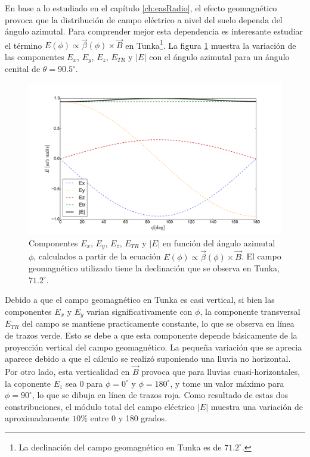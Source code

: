 	En base a lo estudiado en el cap\'itulo \ref{ch:easRadio}, el efecto geomagn\'etico provoca que la distribuci\'on de campo el\'ectrico a nivel del suelo dependa del \'angulo azimutal.
	Para comprender mejor esta dependencia es interesante estudiar el t\'ermino $E(\phi)\propto\vec\beta(\phi)\times \vec B$ en Tunka\footnote{La declinaci\'on del campo geomagn\'etico en Tunka es de $71.2^\circ$.}.
	La figura \ref{fig:geomComps_Tunka} muestra la variaci\'on de las componentes $E_x$, $E_y$, $E_z$, $E_{TR}$ y $|E|$ con el \'angulo azimutal para un \'angulo cenital de $\theta=90.5^\circ$.
	\begin{figure}[ht!]
		\centering
		\includegraphics[width=\textwidth]{./fig/simulacionRadio/geomComps_Tunka}
		\caption{\label{fig:geomComps_Tunka}
		Componentes $E_x$, $E_y$, $E_z$, $E_{TR}$ y $|E|$ en funci\'on del \'angulo azimutal 
		$\phi$, calculados a partir de la ecuaci\'on $E(\phi)\propto\vec\beta(\phi)\times \vec B$. El campo geomagn\'etico utilizado tiene la declinaci\'on que se observa en Tunka,$71.2^\circ$. 
		}
	\end{figure}
	Debido a que el campo geomagn\'etico en Tunka es casi vertical, si bien las componentes $E_x$ y $E_y$ var\'ian significativamente con $\phi$, la componente transversal $E_{TR}$ del campo se mantiene practicamente constante, lo que se observa en l\'inea de trazos verde. 
	Esto se debe a que esta componente depende b\'asicamente de la proyecci\'on vertical del campo geomagn\'etico.
	La peque\~na variaci\'on que se aprecia aparece debido a que el c\'alculo se realiz\'o suponiendo una lluvia no horizontal.
	Por otro lado, esta verticalidad en $\vec B$ provoca que para lluvias cuasi-horizontales, la coponente $E_z$ sea 0 para $\phi=0^\circ$ y $\phi=180^\circ$, y tome un valor m\'aximo para $\phi=90^\circ$, lo que se dibuja en l\'inea de trazos roja. 
	Como resultado de estas dos constribuciones, el m\'odulo total del campo el\'ectrico $|E|$ muestra una variaci\'on de aproximadamente $10\%$ entre 0 y 180 grados. 
	
